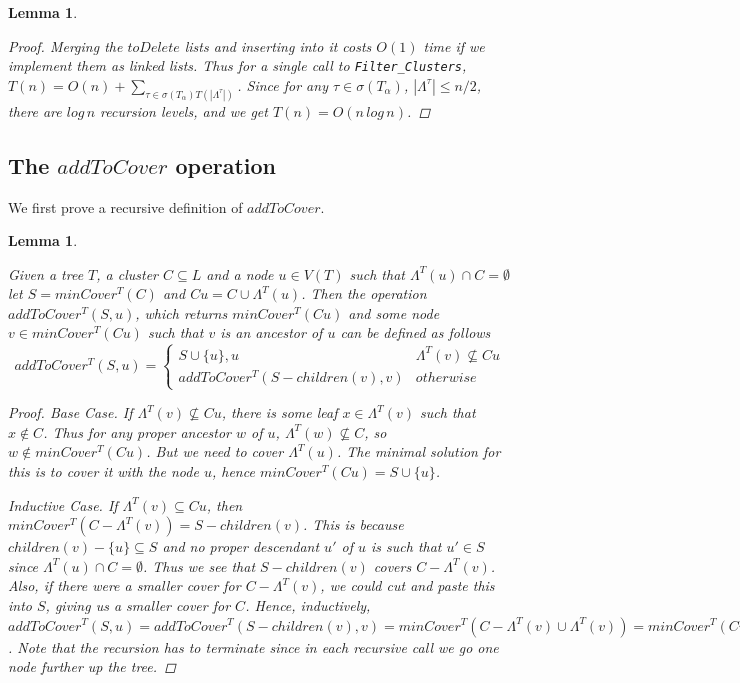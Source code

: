 \documentclass{article}
\newcommand{\leafset}{\Lambda}
\newcommand{\TA}{T_\alpha}
\newtheorem{mincoverrecursive}[incompatibility]{Lemma}
\newtheorem{filterclustersruntime}[incompatibility]{Lemma}
\begin{document}
\begin{filterclustersruntime}
\begin{proof}
            Merging the $toDelete$ lists and inserting into it costs $O(1)$ time if we implement them as linked lists. Thus for a single call to \texttt{Filter\_Clusters}, $T(n) = O(n) + \sum_{\tau \in \sigma(\TA) T(|\leafset^{\tau}|)}$. Since for any $\tau \in \sigma(\TA)$, $|\leafset^{\tau}| \leq n/2$, there are $log\,n$ recursion levels, and we get $T(n) = O(n\,log\,n)$.
        \end{proof}
    \end{filterclustersruntime}

    \subsection{The $addToCover$ operation}
    \label{subsec:addtocover}

    We first prove a recursive definition of $addToCover$.
    \newline

    \begin{mincoverrecursive}
        \label{lem:mincoverrecursive}

        Given a tree $T$, a cluster $C \subseteq L$ and a node $u \in V(T)$ such that $\leafset^{T}(u) \cap C = \emptyset$ let $S = minCover^{T}(C)$ and $Cu = C \cup \leafset^{T}(u)$. Then the operation $addToCover^{T}(S, u)$, which returns $minCover^{T}(Cu)$ and some node $v \in minCover^{T}(Cu)$ such that $v$ is an ancestor of $u$ can be defined as follows \[addToCover^{T}(S, u) =
        \begin{cases}
            S \cup \{u\}, u & \leafset^{T}(v) \not\subseteq Cu\\
            addToCover^{T}(S - children(v), v) & otherwise
        \end{cases}\]

        \begin{proof}
            \textit{Base Case.} If $\leafset^{T}(v) \not\subseteq Cu$, there is some leaf $x \in \leafset^{T}(v)$ such that $x \not\in C$. Thus for any proper ancestor $w$ of $u$, $\leafset^{T}(w) \not\subseteq C$, so $w \not\in minCover^{T}(Cu)$. But we need to cover $\leafset^{T}(u)$. The minimal solution for this is to cover it with the node $u$, hence $minCover^{T}(Cu) = S \cup \{u\}$.

            \textit{Inductive Case.} If $\leafset^{T}(v) \subseteq Cu$, then $minCover^{T}(C - \leafset^{T}(v)) = S - children(v)$. This is because $children(v) - \{u\} \subseteq S$ and no proper descendant $u'$ of $u$ is such that $u' \in S$ since $\leafset^{T}(u) \cap C = \emptyset$. Thus we see that $S - children(v)$ covers $C - \leafset^{T}(v)$. Also, if there were a smaller cover for $C - \leafset^{T}(v)$, we could cut and paste this into $S$, giving us a smaller cover for $C$. Hence, inductively, $addToCover^{T}(S, u) = addToCover^{T}(S - children(v), v) = minCover^{T}(C - \leafset^{T}(v) \cup \leafset^{T}(v)) = minCover^{T}(Cu)$. Note that the recursion has to terminate since in each recursive call we go one node further up the tree.
        \end{proof}
    \end{mincoverrecursive}
\end{document}
